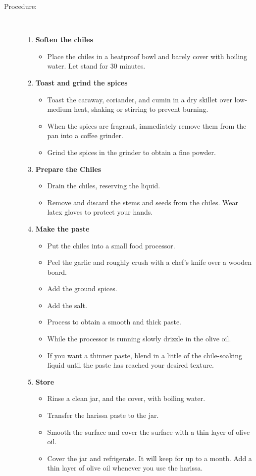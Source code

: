 \documentclass[11pt,letterpaper]{article}
\begin{document}
\begin{description}
\item[Procedure:]\ \\
	\begin{enumerate}
	\item {\bf Soften the chiles}
	\begin{itemize}
	\item Place the chiles in a heatproof bowl and barely cover with boiling water. Let stand for 30 minutes.
	\end{itemize}
	\item {\bf Toast and grind the spices}
	\begin{itemize}
	\item Toast the caraway, coriander, and cumin in a dry skillet over low-medium heat, shaking or stirring to prevent burning. 
	\item When the spices are fragrant, immediately remove them from the pan into a coffee grinder.
	\item Grind the spices in the grinder to obtain a fine powder.
	\end{itemize}
	\item {\bf Prepare the Chiles}
	\begin{itemize}
	\item Drain the chiles, reserving the liquid.
	\item Remove and discard the stems and seeds from the chiles. Wear latex gloves to protect your hands.
	\end{itemize}
	\item {\bf Make the paste}
	\begin{itemize}
	\item Put the chiles into a small food processor.
	\item Peel the garlic and roughly crush with a chef's knife over a wooden board.
	\item Add the ground spices.
	\item Add the salt.
	\item Process to obtain a smooth and thick paste.
	\item While the processor is running slowly drizzle in the olive oil.
	\item  If you want a thinner paste, blend in a little of the chile-soaking liquid until the paste has reached your desired texture.
	\end{itemize}
	\item {\bf Store}
	\begin{itemize}
	\item Rinse a clean jar, and the cover, with boiling water.
	\item Transfer the harissa paste to the jar.
	\item Smooth the surface and cover the surface with a thin layer of olive oil.
	\item Cover the jar and refrigerate. It will keep for up to a month. Add a thin layer of olive oil whenever you use the harissa.
	\end{itemize}
	\end{enumerate}
\end{description}
\end{document}

